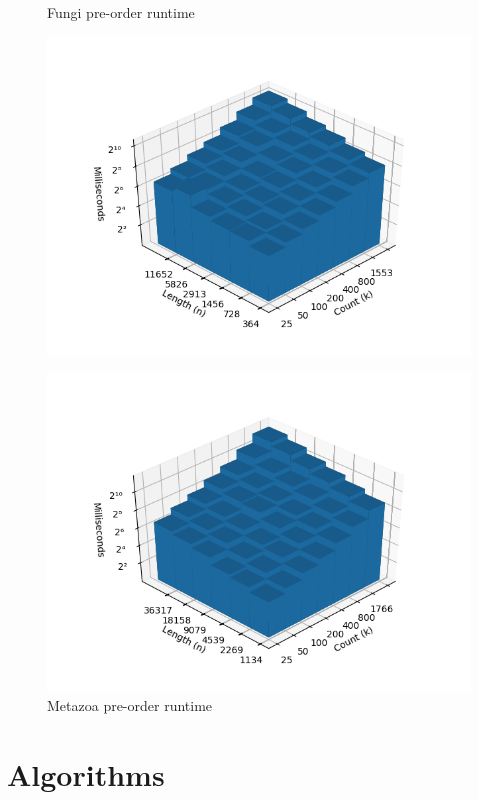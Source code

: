 \documentclass{bmcart}
\begin{document}
\begin{backmatter}
\begin{figure}[h]
\begin{minipage}{0.48\textwidth}
			\centering
			\caption{Fungi pre-order runtime}
			\label{Fig:Fungi}
			\includegraphics[width=1.1\textwidth]{fungi-preorder.png}
		\end{minipage}
		\hfill
		\begin{minipage}{0.48\textwidth}
			\centering
			\caption{Metazoa pre-order runtime}
			\label{Fig:Metazoa}
			\includegraphics[width=1.1\textwidth]{metazoa-preorder.png}
		\end{minipage}
		
	\end{figure}

	
	\section*{Algorithms}	
	

\end{backmatter}
\end{document}
